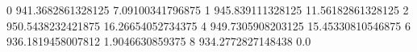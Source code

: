 0 941.3682861328125 7.09100341796875
1 945.839111328125 11.56182861328125
2 950.5438232421875 16.26654052734375
4 949.7305908203125 15.45330810546875
6 936.1819458007812 1.9046630859375
8 934.2772827148438 0.0
